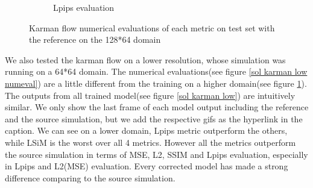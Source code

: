 \documentclass[a4paper,12pt,twoside]{report}
\begin{document}
\begin{figure}
\begin{subfigure}{0.32\textwidth}
		\caption{Lpips evaluation}
	\end{subfigure}
	\caption{Karman flow numerical evaluations of each metric on test set with the reference on the 128*64 domain}
	\label{sol karman high numeval}
\end{figure}

We also tested the karman flow on a lower resolution, whose simulation was running on a 64*64 domain.
The numerical evaluations(see figure \ref{sol karman low numeval}) are a little different from the training on a higher domain(see figure \ref{sol karman high numeval}). The outputs from all trained model(see figure \ref{sol karman low}) are intuitively similar. We only show the last frame of each model output including the reference and the source simulation, but we add the respective gifs as the hyperlink in the caption.
We can see on a lower domain, Lpips metric outperform the others, while LSiM is the worst over all 4 metrics. However all the metrics outperform the source simulation in terms of MSE, L2, SSIM and Lpips evaluation, especially in Lpips and L2(MSE) evaluation. Every corrected model has made a strong difference comparing to the source simulation.  
\end{document}
